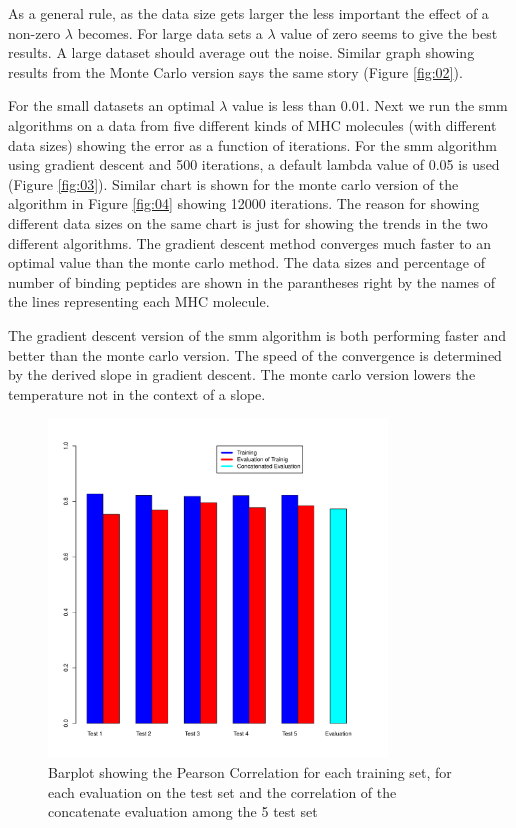 \documentclass{bioinfo}
\begin{document}
\begin{application}
\par As a general rule, as the data size gets larger the less important the effect of a non-zero $\lambda$ becomes. For large data sets a $\lambda$ value of zero seems to give the best results. A large dataset should average out the noise. Similar graph showing results from the Monte Carlo version says the same story (Figure \ref{fig:02}).
\par For the small datasets an optimal $\lambda$ value is  less than 0.01. Next we run the smm algorithms on a data from five different kinds of MHC molecules (with different data sizes) showing the error as a function of iterations. For the smm algorithm using gradient descent and 500 iterations, a default lambda value of 0.05 is used (Figure \ref{fig:03}). Similar chart is shown for the monte carlo version of the algorithm in Figure \ref{fig:04} showing 12000 iterations. The reason for showing different data sizes on the same chart is just for showing the trends in the two different algorithms. The gradient descent method converges much faster to an optimal value than the monte carlo method. The data sizes and percentage of number of binding peptides are shown in the parantheses right by the names of the lines representing each MHC molecule.
\par The gradient descent version of the smm algorithm is both performing faster and better than the monte carlo version. The speed of the convergence is determined by the derived slope in gradient descent. The monte carlo version lowers the temperature not in the context of a slope.


\begin{figure}[!tpb]
\centerline{\includegraphics[width=9cm]{fig/barplot.pdf}}
\caption{Barplot showing the Pearson Correlation for each training set, for each evaluation on the test set and the correlation of the concatenate evaluation among the 5 test set}
\label{fig:05}
\end{figure}








%
%
%
%
%






\end{application}
\end{document}
